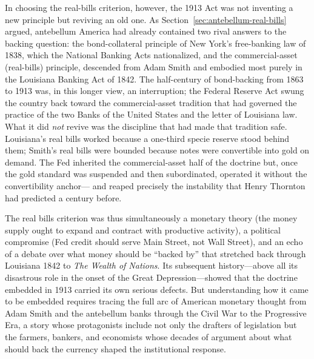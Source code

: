 \documentclass[12pt]{article}
\begin{document}
In choosing the real-bills criterion, however, the 1913 Act was not inventing a
new principle but reviving an old one.  As Section~\ref{sec:antebellum-real-bills}
argued, antebellum America had already contained two rival answers to the backing
question: the bond-collateral principle of New York's free-banking law of 1838,
which the National Banking Acts nationalized, and the commercial-asset (real-bills)
principle, descended from Adam Smith and embodied most purely in the Louisiana
Banking Act of 1842.  The half-century of bond-backing from 1863 to 1913 was, in
this longer view, an interruption; the Federal Reserve Act swung the country back
toward the commercial-asset tradition that had governed the practice of the two
Banks of the United States and the letter of Louisiana law.  What it did \emph{not}
revive was the discipline that had made that tradition safe.  Louisiana's real
bills worked because a one-third specie reserve stood behind them; Smith's real
bills were bounded because notes were convertible into gold on demand.  The Fed
inherited the commercial-asset half of the doctrine but, once the gold standard was
suspended and then subordinated, operated it without the convertibility anchor---
and reaped precisely the instability that Henry Thornton had predicted a century
before.

The real bills criterion was thus simultaneously a monetary theory (the money
supply ought to expand and contract with productive activity), a political
compromise (Fed credit should serve Main Street, not Wall Street), and an echo of a
debate over what money should be ``backed by'' that stretched back through Louisiana
1842 to \emph{The Wealth of Nations}.  Its subsequent history---above all its
disastrous role in the onset of the Great Depression---showed that the doctrine
embedded in 1913 carried its own serious defects.  But understanding how it came to
be embedded requires tracing the full arc of American monetary thought from Adam
Smith and the antebellum banks through the Civil War to the Progressive Era, a
story whose protagonists include not only the drafters of legislation but the
farmers, bankers, and economists whose decades of argument about what should back
the currency shaped the institutional response.
\end{document}
